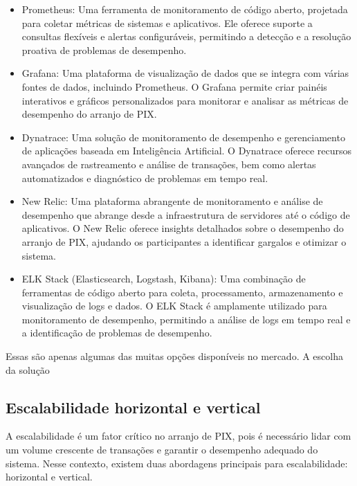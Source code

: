 \documentclass[12pt]{article}
\begin{document}
\begin{itemize}

\item Prometheus: Uma ferramenta de monitoramento de código aberto, projetada para coletar métricas de sistemas e aplicativos. Ele oferece suporte a consultas flexíveis e alertas configuráveis, permitindo a detecção e a resolução proativa de problemas de desempenho.

\item Grafana: Uma plataforma de visualização de dados que se integra com várias fontes de dados, incluindo Prometheus. O Grafana permite criar painéis interativos e gráficos personalizados para monitorar e analisar as métricas de desempenho do arranjo de PIX.

\item Dynatrace: Uma solução de monitoramento de desempenho e gerenciamento de aplicações baseada em Inteligência Artificial. O Dynatrace oferece recursos avançados de rastreamento e análise de transações, bem como alertas automatizados e diagnóstico de problemas em tempo real.

\item New Relic: Uma plataforma abrangente de monitoramento e análise de desempenho que abrange desde a infraestrutura de servidores até o código de aplicativos. O New Relic oferece insights detalhados sobre o desempenho do arranjo de PIX, ajudando os participantes a identificar gargalos e otimizar o sistema.

\item ELK Stack (Elasticsearch, Logstash, Kibana): Uma combinação de ferramentas de código aberto para coleta, processamento, armazenamento e visualização de logs e dados. O ELK Stack é amplamente utilizado para monitoramento de desempenho, permitindo a análise de logs em tempo real e a identificação de problemas de desempenho.

\end{itemize}

Essas são apenas algumas das muitas opções disponíveis no mercado. A escolha da solução

\subsection{Escalabilidade horizontal e vertical} \label{sec:tecnologia}

A escalabilidade é um fator crítico no arranjo de PIX, pois é necessário lidar com um volume crescente de transações e garantir o desempenho adequado do sistema. Nesse contexto, existem duas abordagens principais para escalabilidade: horizontal e vertical.
\end{document}
